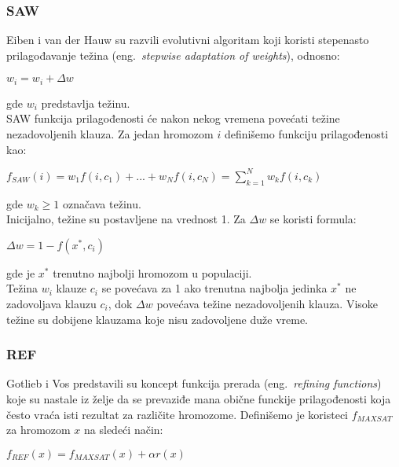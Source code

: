 \documentclass{article}
\begin{document}
\subsubsection{SAW}
\label{sec:fitness_saw}
Eiben i van der Hauw su razvili evolutivni algoritam koji koristi stepenasto prilagođavanje težina (eng.~{\em stepwise adaptation of weights}), odnosno:

	\begin{center}
	$ w_i = w_i + \Delta w $
	\end{center}
	
gde $ w_i $ predstavlja težinu. \\

SAW funkcija prilagođenosti će nakon nekog vremena povećati težine nezadovoljenih klauza. Za jedan hromozom $ i $ definišemo funkciju prilagođenosti kao:\\

	\begin{center}
	$ f_{SAW}(i) = w_1 f(i, c_1) + ... + w_N f(i, c_N) = \sum_{k=1}^{N} w_k f(i, c_k)	$
	\end{center}
	
gde $w_k \geq 1 $ označava težinu.\\

Inicijalno, težine su postavljene na vrednost 1. Za $ \Delta w $ se koristi formula:

	\begin{center}
	$ \Delta w = 1 - f(x^*, c_i) $
	\end{center}
	
gde  je $x^*$ trenutno najbolji hromozom u populaciji. \\

Težina $w_i$ klauze $c_i$ se povećava za 1 ako trenutna najbolja jedinka $x^*$ ne zadovoljava klauzu $c_i$, dok $\Delta w$ povećava težine nezadovoljenih klauza. Visoke težine su dobijene klauzama koje nisu zadovoljene duže vreme. 

\subsubsection{REF}
\label{sec:fitness_rfea}
Gotlieb i Vos \cite{GotVos98_f_ref} predstavili su koncept funkcija prerada 
(eng.~{\em refining functions}) koje su nastale iz želje da se prevaziđe mana obične 
funckije prilagođenosti koja često vraća isti rezultat za različite hromozome. 
Definišemo je koristeci $f_{MAXSAT}$ za hromozom $x$ na sledeći način:

\begin{center}
	$ f_{REF} (x) = f_{MAXSAT} (x) + \alpha r(x) $
\end{center}
\end{document}
